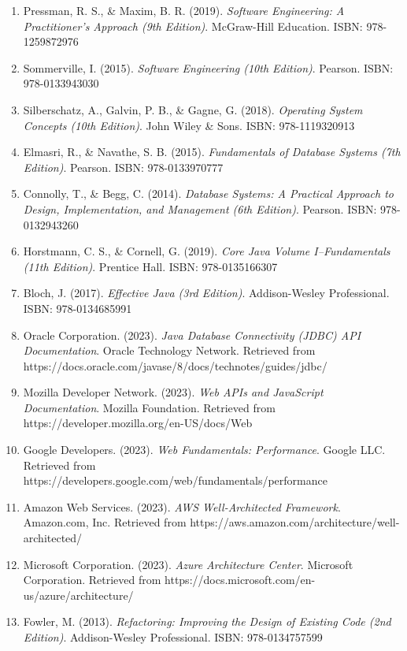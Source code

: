 \begin{enumerate}
\item Pressman, R. S., \& Maxim, B. R. (2019). \textit{Software Engineering: A Practitioner's Approach (9th Edition)}. McGraw-Hill Education. ISBN: 978-1259872976

\item Sommerville, I. (2015). \textit{Software Engineering (10th Edition)}. Pearson. ISBN: 978-0133943030

\item Silberschatz, A., Galvin, P. B., \& Gagne, G. (2018). \textit{Operating System Concepts (10th Edition)}. John Wiley \& Sons. ISBN: 978-1119320913

\item Elmasri, R., \& Navathe, S. B. (2015). \textit{Fundamentals of Database Systems (7th Edition)}. Pearson. ISBN: 978-0133970777

\item Connolly, T., \& Begg, C. (2014). \textit{Database Systems: A Practical Approach to Design, Implementation, and Management (6th Edition)}. Pearson. ISBN: 978-0132943260

\item Horstmann, C. S., \& Cornell, G. (2019). \textit{Core Java Volume I--Fundamentals (11th Edition)}. Prentice Hall. ISBN: 978-0135166307

\item Bloch, J. (2017). \textit{Effective Java (3rd Edition)}. Addison-Wesley Professional. ISBN: 978-0134685991

\item Oracle Corporation. (2023). \textit{Java Database Connectivity (JDBC) API Documentation}. Oracle Technology Network. Retrieved from https://docs.oracle.com/javase/8/docs/technotes/guides/jdbc/

\item Mozilla Developer Network. (2023). \textit{Web APIs and JavaScript Documentation}. Mozilla Foundation. Retrieved from https://developer.mozilla.org/en-US/docs/Web

\item Google Developers. (2023). \textit{Web Fundamentals: Performance}. Google LLC. Retrieved from https://developers.google.com/web/fundamentals/performance

\item Amazon Web Services. (2023). \textit{AWS Well-Architected Framework}. Amazon.com, Inc. Retrieved from https://aws.amazon.com/architecture/well-architected/

\item Microsoft Corporation. (2023). \textit{Azure Architecture Center}. Microsoft Corporation. Retrieved from https://docs.microsoft.com/en-us/azure/architecture/

\item Fowler, M. (2013). \textit{Refactoring: Improving the Design of Existing Code (2nd Edition)}. Addison-Wesley Professional. ISBN: 978-0134757599

\end{enumerate}